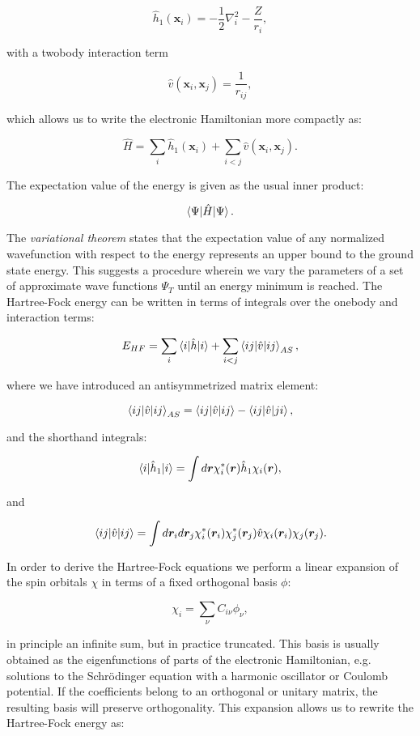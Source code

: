 $$ \hat{h}_1(\bm{x}_i) = -\frac{1}{2} \nabla_i^2
    -\frac{Z}{r_i} , $$

with a twobody interaction term

$$ \hat{v}(\bm{x}_i, \bm{x}_j) = \frac{1}{r_{ij}} , $$

which allows us to write the electronic Hamiltonian more compactly as:

$$ \hat{H} = \sum_i \hat{h}_1(\bm{x}_i)
    + \sum_{i < j} \hat{v}(\bm{x}_i, \bm{x}_j) .$$

The expectation value of the energy is given as the usual inner product:

$$ \braket{\Psi | \hat{H} | \Psi} .$$

The \textit{variational theorem} states that the expectation
value of any normalized wavefunction with respect to the energy
represents an upper bound to the ground state energy.
This suggests a procedure wherein we vary the parameters
of a set of approximate wave functions $\Psi_T$
until an energy minimum is reached.
The Hartree-Fock energy can be written in terms of integrals
over the onebody and interaction terms:

$$ E_{HF} = \sum_i \braket{i | \hat{h} | i}
    + \sum_{i < j} \braket{ij | \hat{v} | ij}_{AS} ,$$

where we have introduced an antisymmetrized matrix element:

$$ \braket{ij | \hat{v} | ij}_{AS}
    = \braket{ij | \hat{v} | ij} - \braket{ij | \hat{v} | ji} , $$

and the shorthand integrals:

$$ \braket{i | \hat{h}_1 | i} =
    \int d\bm{r} \chi_i^*(\bm{r}) \hat{h}_1 \chi_i(\bm{r}) , $$

and

$$ \braket{ij | \hat{v} | ij} =
    \int d\bm{r}_i d\bm{r}_j \chi_i^*(\bm{r}_i) \chi_j^*(\bm{r}_j) 
    \hat{v} \chi_i(\bm{r}_i) \chi_j(\bm{r}_j) . $$

In order to derive the Hartree-Fock equations
we perform a linear expansion of the spin orbitals
$\chi$ in terms of a fixed orthogonal basis $\phi$:

$$ \chi_i = \sum_{\nu} C_{i\nu} \phi_{\nu} , $$

in principle an infinite sum, but in practice truncated.
This basis is usually obtained as the eigenfunctions of
parts of the electronic Hamiltonian, e.g. solutions
to the Schr\"{o}dinger equation with a harmonic oscillator
or Coulomb potential.
If the coefficients belong to an orthogonal or unitary matrix,
the resulting basis will preserve orthogonality.
This expansion allows us to rewrite the Hartree-Fock energy as:

